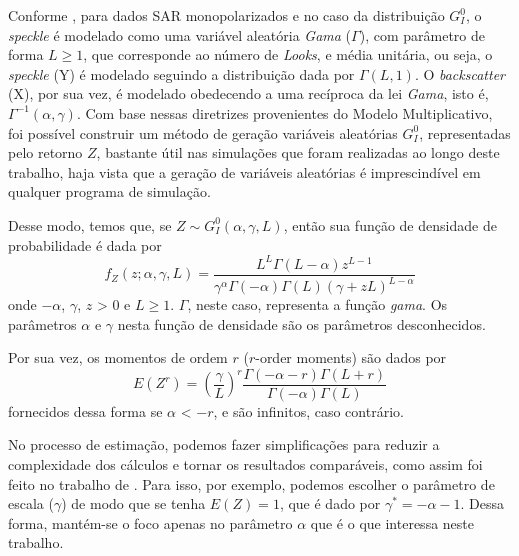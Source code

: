 Conforme \citet{FreryStochasticDistances2015}, para dados SAR monopolarizados e no caso da distribuição $G_I^0$, o \textit{speckle} é modelado como uma variável aleatória \textit{Gama} ($\Gamma$), com parâmetro de forma $L \geq 1$, que corresponde ao número de \textit{Looks}, e média unitária, ou seja, o \textit{speckle} (Y) é modelado seguindo a distribuição dada por $\Gamma(L,1)$. O \textit{backscatter} (X), por sua vez, é modelado obedecendo a uma recíproca da lei \textit{Gama}, isto é, $\Gamma^{-1}(\alpha,\gamma)$. Com base nessas diretrizes provenientes do Modelo Multiplicativo, foi possível construir um método de geração variáveis aleatórias $G_I^0$, representadas pelo retorno $Z$, bastante útil nas simulações que foram realizadas ao longo deste trabalho, haja vista que a geração de variáveis aleatórias é imprescindível em qualquer programa de simulação.

Desse modo, temos que, se $Z \sim G_I^0(\alpha, \gamma, L)$, então sua função de densidade de probabilidade é dada por
\begin{equation}
    f_Z(z; \alpha, \gamma, \textit{L})= \frac{L^L\Gamma(L-\alpha)z^{L-1}}{\gamma^\alpha\Gamma(-\alpha)\Gamma(L)(\gamma + zL)^{L-\alpha}} \label{eq:fdpGI0}
\end{equation}
onde $-\alpha$, $\gamma$, $z$ > $0$ e $L \geq 1$. $\Gamma$, neste caso, representa a função \textit{gama}. Os parâmetros $\alpha$ e $\gamma$ nesta função de densidade são os parâmetros desconhecidos.

Por sua vez, os momentos de ordem $r$ ($r$-order moments) são dados por
\begin{equation}
    E(Z^r) = \left (\frac{\gamma}{L}\right )^{r}\frac{\Gamma(-\alpha-r)\Gamma(L+r)}{\Gamma(-\alpha)\Gamma(L)} \label{eq:moments}
\end{equation}
fornecidos dessa forma se $\alpha$ < $-r$, e são infinitos, caso contrário.

No processo de estimação, podemos fazer simplificações para reduzir a complexidade dos cálculos e tornar os resultados comparáveis, como assim foi feito no trabalho de \citet{FreryStochasticDistances2015}. Para isso, por exemplo, podemos escolher o parâmetro de escala ($\gamma$) de modo que se tenha $E(Z) = 1$, que é dado por $\gamma^{*} = -\alpha - 1$. Dessa forma, mantém-se o foco apenas no parâmetro $\alpha$ que é o que interessa neste trabalho.

